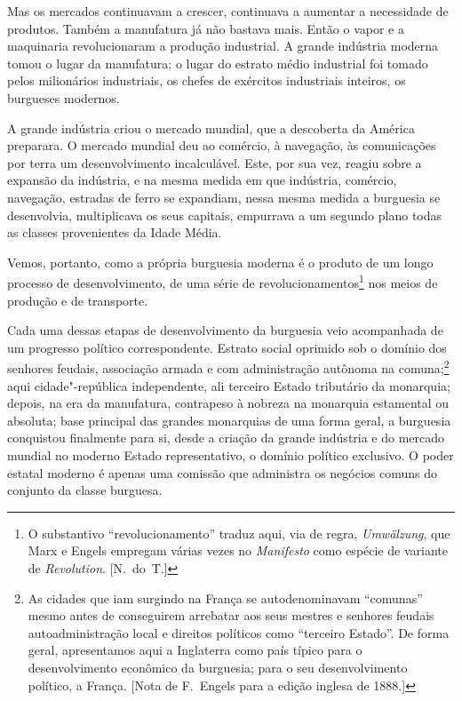 Mas os mercados continuavam a crescer, continuava a aumentar a
necessidade de produtos. Também a manufatura já não bastava mais. Então
o vapor e a maquinaria revolucionaram a produção industrial. A grande
indústria moderna tomou o lugar da manufatura; o lugar do estrato médio
industrial foi tomado pelos milionários industriais, os chefes de
exércitos industriais inteiros, os burgueses modernos.

A grande indústria criou o mercado mundial, que a descoberta da América
preparara. O mercado mundial deu ao comércio, à navegação, às
comunicações por terra um desenvolvimento incalculável. Este, por sua
vez, reagiu sobre a expansão da indústria, e na mesma medida em que
indústria, comércio, navegação, estradas de ferro se expandiam, nessa
mesma medida a burguesia se desenvolvia, multiplicava os seus capitais,
empurrava a um segundo plano todas as classes provenientes da Idade
Média.

Vemos, portanto, como a própria burguesia moderna é o produto de
um longo processo de desenvolvimento, de uma série de 
revolucionamentos\footnote{ O substantivo ``revolucionamento'' traduz aqui, via de regra, \textit{Umwälzung}, que Marx e Engels empregam várias vezes no
\textit{Manifesto} como espécie de variante de \textit{Revolution}. [N.~do~T.]} nos meios de produção e de transporte.

Cada uma dessas etapas de desenvolvimento da burguesia veio
acompanhada de um progresso político correspondente. Estrato social
oprimido sob o domínio dos senhores feudais, associação armada e com
administração autônoma na comuna;\footnote{ As cidades que iam surgindo na 
França se autodenominavam ``comunas'' mesmo antes de conseguirem arrebatar aos
seus mestres e senhores feudais autoadministração local e direitos políticos 
como ``terceiro Estado''. De forma geral, apresentamos aqui a Inglaterra
como país típico para o desenvolvimento econômico da burguesia; para o seu 
desenvolvimento político, a França. [Nota de F.~Engels para a edição inglesa 
de 1888.]} aqui cidade"-república independente, ali terceiro Estado
tributário da monarquia; depois, na era da manufatura, contrapeso à
nobreza na monarquia estamental ou absoluta; base principal das grandes
monarquias de uma forma geral, a burguesia conquistou finalmente para
si, desde a criação da grande indústria e do mercado mundial no moderno
Estado representativo, o domínio político exclusivo. O poder estatal
moderno é apenas uma comissão que administra os negócios comuns do
conjunto da classe burguesa.

